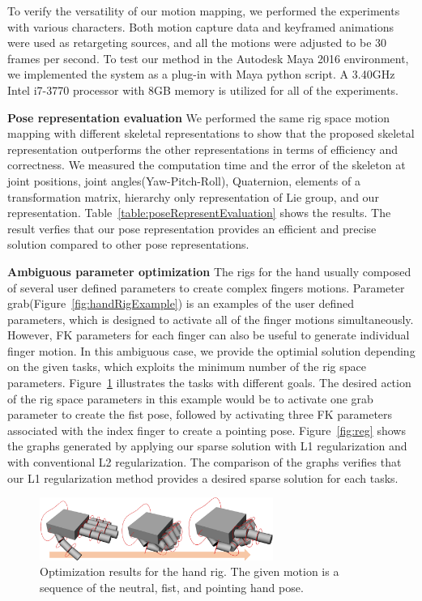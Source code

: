 To verify the versatility of our motion mapping, we performed the experiments with various characters.
Both motion capture data and keyframed animations were used as retargeting sources, and all the motions were adjusted to be 30 frames per second. To test our method in the Autodesk Maya 2016 environment, we implemented the system as a plug-in with Maya python script. A 3.40GHz Intel i7-3770 processor with 8GB memory is utilized for all of the experiments.

\textbf{Pose representation evaluation}
We performed the same rig space motion mapping with different skeletal representations to show that the proposed skeletal representation outperforms the other representations in terms of efficiency and correctness. We measured the computation time and the error of the skeleton at joint positions, joint angles(Yaw-Pitch-Roll), Quaternion, elements of a transformation matrix, hierarchy only representation of Lie group, and our representation. Table~\ref{table:poseRepresentEvaluation} shows the results. The result verfies that our pose representation provides an efficient and precise solution compared to other pose representations.

\textbf{Ambiguous parameter optimization}
The rigs for the hand usually composed of several user defined parameters to create complex fingers motions. Parameter grab(Figure~\ref{fig:handRigExample}) is an examples of the user defined parameters, which is designed to activate all of the finger motions simultaneously. However, FK parameters for each finger can also be useful to generate individual finger motion. In this ambiguous case, we provide the optimial solution depending on the given tasks, which exploits the minimum number of the rig space parameters. Figure~\ref{fig:handExample} illustrates the tasks with different goals. The desired action of the rig space parameters in this example would be to activate one grab parameter to create the fist pose, followed by activating three FK parameters associated with the index finger to create a pointing pose. Figure~\ref{fig:reg} shows the graphs generated by applying our sparse solution with L1 regularization and with conventional L2 regularization. The comparison of the graphs verifies that our L1 regularization method provides a desired sparse solution for each tasks.

\begin{figure}[!ht]
  \centering
  \includegraphics[width=3.0in]{images/handExample}
  \caption{Optimization results for the hand rig. The given motion is a sequence of the neutral, fist, and pointing hand pose.}
  \label{fig:handExample}
\end{figure}

